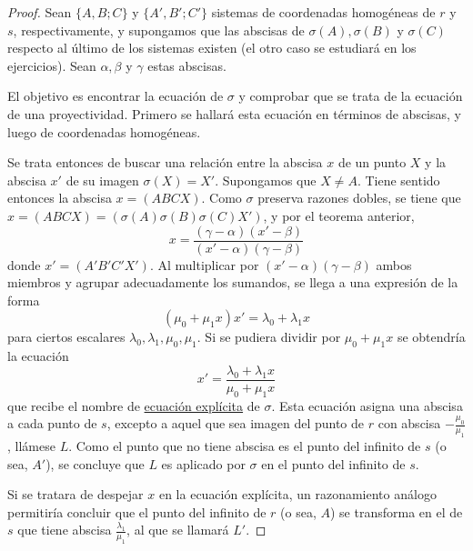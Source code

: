 \documentclass[12pt]{report}
\theoremstyle{definition}
\theoremstyle{definition}
\theoremstyle{remark}
\begin{document}
\begin{proof}
Sean $\{A,B;C\}$ y $\{A',B';C'\}$ sistemas de coordenadas homogéneas de $r$ y $s$, respectivamente, y supongamos que las abscisas de $\sigma(A), \sigma(B)$ y $\sigma(C)$ respecto al último de los sistemas existen (el otro caso se estudiará en los ejercicios). Sean $\alpha, \beta$ y $\gamma$ estas abscisas.

\vspace{2mm}
El objetivo es encontrar la ecuación de $\sigma$ y comprobar que se trata de la ecuación de una proyectividad. Primero se hallará esta ecuación en términos de abscisas, y luego de coordenadas homogéneas. 

\vspace{2mm}
Se trata entonces de buscar una relación entre la abscisa $x$ de un punto $X$ y la abscisa $x'$ de su imagen $\sigma(X) = X'$. Supongamos que $X \neq A$. Tiene sentido entonces la abscisa $x = (ABCX)$. Como $\sigma$ preserva razones dobles, se tiene que $x = (ABCX) = (\sigma(A)\sigma(B)\sigma(C)X')$, y por el teorema anterior,
\[x = \frac{(\gamma - \alpha)(x'-\beta)}{(x'-\alpha)(\gamma-\beta)}\]
donde $x' = (A'B'C'X')$. Al multiplicar por $(x'-\alpha)(\gamma-\beta)$ ambos miembros y agrupar adecuadamente los sumandos, se llega a una expresión de la forma
\[(\mu_0 +\mu_1 x)x' = \lambda_0+\lambda_1x\]
para ciertos escalares $\lambda_0,\lambda_1,\mu_0,\mu_1$. Si se pudiera dividir por $\mu_0 +\mu_1x$ se obtendría la ecuación
\[x' = \frac{\lambda_0 + \lambda_1 x}{\mu_0 + \mu_1x}\]
que recibe el nombre de \ul{ecuación explícita} de $\sigma$. Esta ecuación asigna una abscisa a cada punto de $s$, excepto a aquel que sea imagen del punto de $r$ con abscisa $-\frac{\mu_0}{\mu_1}$, llámese $L$. Como el punto que no tiene abscisa es el punto del infinito de $s$ (o sea, $A'$), se concluye que $L$ es aplicado por $\sigma$ en el punto del infinito de $s$.

\vspace{2mm}
Si se tratara de despejar $x$ en la ecuación explícita, un razonamiento análogo permitiría concluir que el punto del infinito de $r$ (o sea, $A$) se transforma en el de $s$ que tiene abscisa $\frac{\lambda_1}{\mu_1}$, al que se llamará $L'$.


\end{proof}
\end{document}
